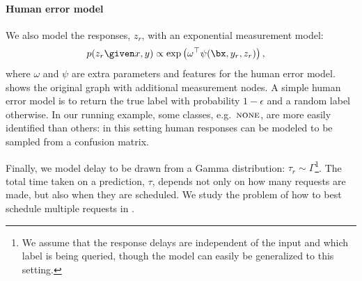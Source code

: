 
\paragraph{Human error model}
We also model the responses, $z_r$, with an exponential measurement model:
\begin{align*}
  p(z_r \given x, y) 
  &\propto \exp \left( \omega^\top\psi(\bx, y_r, z_r) \right),
\end{align*}
where $\omega$ and $\psi$ are extra parameters and features for the human error model. 
 shows the original graph with additional measurement nodes.
A simple human error model is to return the true label with probability $1-\epsilon$ and a random label otherwise.
In our running example, some classes, e.g.\ $\textsc{none}$, are more easily identified than others: in this setting human responses can be modeled to be sampled from a confusion matrix.

Finally, we model delay to be drawn from a Gamma distribution: $\tau_r \sim \Gamma$\footnote{We assume that the response delays are independent of the input and which label is being queried, though the model can easily be generalized to this setting.}.
The total time taken on a prediction, $\tau$, depends not only on how many requests are made, but also when they are scheduled.
We study the problem of how to best schedule multiple requests in .



